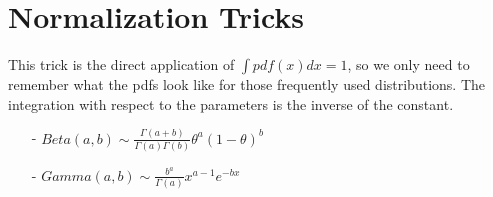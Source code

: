 \chapter{Normalization Tricks}
This trick is the direct application of $\int pdf(x) dx = 1$, so we only need to remember what the pdfs look like for those frequently used distributions. The integration with respect to the parameters is the inverse of the constant.

\begin{enumerate}
	\item[-] $Beta(a,b) \sim \frac{\Gamma(a+b)}{\Gamma(a)\Gamma(b)}\theta^a(1-\theta)^b$
	\item[-] $Gamma(a,b) \sim \frac{b^a}{\Gamma(a)}x^{a-1}e^{-bx}$
\end{enumerate}